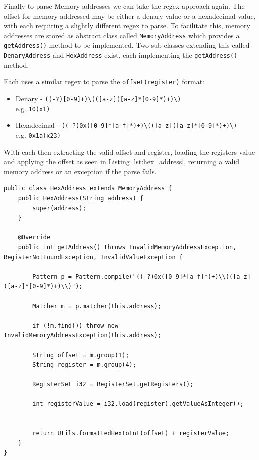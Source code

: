Finally to parse Memory addresses we can take the regex approach again. The offset for memory addressed may be either a denary value or a hexadecimal value, with each requiring a slightly different regex to parse. To facilitate this, memory addresses are stored as abstract class called \texttt{MemoryAddress} which provides a \verb|getAddress()| method to be implemented. Two sub classes extending this called \texttt{DenaryAddress} and \texttt{HexAddress} exist, each implementing the \verb|getAddress()| method.

Each uses a similar regex to parse the \verb|offset(register)| format:
\begin{itemize}
    \item Denary - \verb|((-?)[0-9]+)\(([a-z]([a-z]*[0-9]*)+)\)|
    \\ e.g. \verb|10(x1)|
    \item Hexadecimal - \verb|((-?)0x([0-9]*[a-f]*)+)\(([a-z]([a-z]*[0-9]*)+)\)|
    \\ e.g. \verb|0x1a(x23)|
\end{itemize}

With each then extracting the valid offset and register, loading the registers value and applying the offset as seen in Listing \ref{lst:hex_address}, returning a valid memory address or an exception if the parse fails.

\begin{lstlisting}[caption=Hex memory address parsing, label=lst:hex_address]
public class HexAddress extends MemoryAddress {
    public HexAddress(String address) {
        super(address);
    }

    @Override
    public int getAddress() throws InvalidMemoryAddressException, RegisterNotFoundException, InvalidValueException {

        Pattern p = Pattern.compile("((-?)0x([0-9]*[a-f]*)+)\\(([a-z]([a-z]*[0-9]*)+)\\)");

        Matcher m = p.matcher(this.address);

        if (!m.find()) throw new InvalidMemoryAddressException(this.address);

        String offset = m.group(1);
        String register = m.group(4);

        RegisterSet i32 = RegisterSet.getRegisters();

        int registerValue = i32.load(register).getValueAsInteger();


        return Utils.formattedHexToInt(offset) + registerValue;
    }
}
\end{lstlisting}

